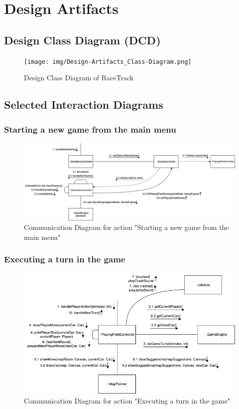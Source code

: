 \section{Design Artifacts}

	\subsection{Design Class Diagram (DCD)}
		\begin{figure}[H]
			\centering
			\texttt{[image: img/Design-Artifacts\_Class-Diagram.png]}
			\caption{Design Class Diagram of RaceTrack}
		\end{figure}

	\subsection{Selected Interaction Diagrams}

		\subsubsection{Starting a new game from the main menu}
			\begin{figure}[H]
				\centering
				\includegraphics[width=14cm,keepaspectratio,center]{img/Design-Artifacts_Communication-Diagrams_New-Game.png}
				\caption{Communication Diagram for action "Starting a new game from the main menu"}
			\end{figure}

		\subsubsection{Executing a turn in the game}
			\begin{figure}[H]
				\centering
				\includegraphics[width=14cm,keepaspectratio,center]{img/Design-Artifacts_Communication-Diagrams_Game-Turn.png}
				\caption{Communication Diagram for action "Executing a turn in the game"}
			\end{figure}

